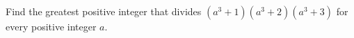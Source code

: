 Find the greatest positive integer that divides $(a^3+1)(a^3+2)(a^3+3)$ for every positive integer $a$.
